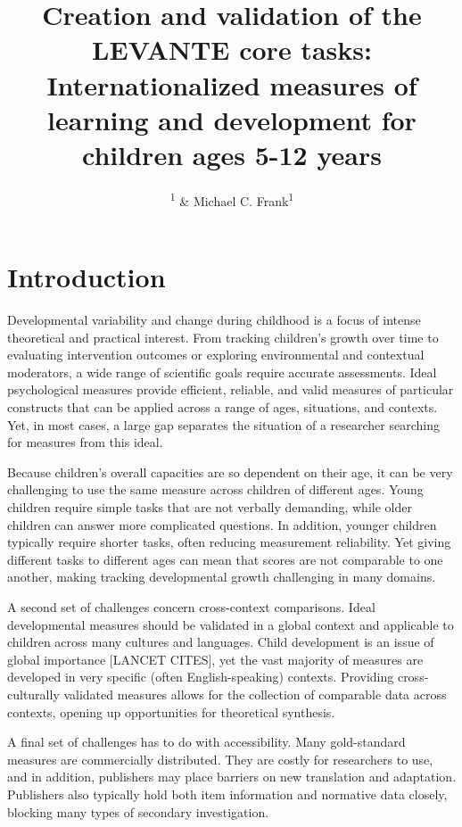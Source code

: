 \documentclass[
  english,
  man]{apa6}
\title{Creation and validation of the LEVANTE core tasks: Internationalized measures of learning and development for children ages 5-12 years}
\author{\textsuperscript{1} \& Michael C. Frank\textsuperscript{1}}
\date{}
\affiliation{\vspace{0.5cm}\textsuperscript{1} Stanford University}
\begin{document}
\maketitle

\section{Introduction}\label{introduction}

Developmental variability and change during childhood is a focus of intense theoretical and practical interest. From tracking children's growth over time to evaluating intervention outcomes or exploring environmental and contextual moderators, a wide range of scientific goals require accurate assessments. Ideal psychological measures provide efficient, reliable, and valid measures of particular constructs that can be applied across a range of ages, situations, and contexts. Yet, in most cases, a large gap separates the situation of a researcher searching for measures from this ideal.

Because children's overall capacities are so dependent on their age, it can be very challenging to use the same measure across children of different ages. Young children require simple tasks that are not verbally demanding, while older children can answer more complicated questions. In addition, younger children typically require shorter tasks, often reducing measurement reliability. Yet giving different tasks to different ages can mean that scores are not comparable to one another, making tracking developmental growth challenging in many domains.

A second set of challenges concern cross-context comparisons. Ideal developmental measures should be validated in a global context and applicable to children across many cultures and languages. Child development is an issue of global importance {[}LANCET CITES{]}, yet the vast majority of measures are developed in very specific (often English-speaking) contexts. Providing cross-culturally validated measures allows for the collection of comparable data across contexts, opening up opportunities for theoretical synthesis.

A final set of challenges has to do with accessibility. Many gold-standard measures are commercially distributed. They are costly for researchers to use, and in addition, publishers may place barriers on new translation and adaptation. Publishers also typically hold both item information and normative data closely, blocking many types of secondary investigation.
\end{document}
